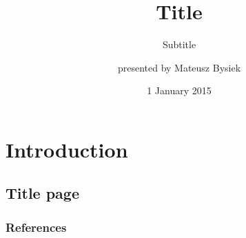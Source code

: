 \documentclass[envcountsect,CJK,
  xcolor={usenames,dvipsnames,svgnames,table,x11names},
  hyperref={unicode,pdfencoding=auto}
  ]{beamer}
\title[codename]{Title}
\subtitle{Subtitle}
\author[M.Bysiek]{presented by Mateusz Bysiek}
\date[1 Jan 2015]{1 January 2015}
\begin{document}
\section{Introduction}

\subsection{Title page}

\begin{frame}

\titlepage


\end{frame}

\begin{frame}
\frametitle{References}

\printbibliography


\end{frame}
\end{document}
